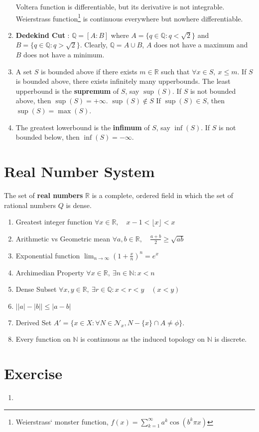 \begin{enumerate}
		\subitem Voltera function is differentiable, but its derivative is not integrable.
		\subitem Weierstrass function\footnote{Weierstrass` monster function, $f(x) = \sum_{k=1}^\infty a^k \cos (b^k\pi x)$ } is continuous everywhere but nowhere differentiable.
	\item \textbf{Dedekind Cut} : $\mathbb{Q} = [A:B]$ where $A = \{ q \in \mathbb{Q} : q < \sqrt{2} \}$ and $B = \{ q \in \mathbb{Q} : q > \sqrt{2} \}$. Clearly, $\mathbb{Q} = A \cup B$, $A$ does not have a maximum and $B$ does not have a minimum.
	\item A set $S$ is bounded above if there exists $m \in \mathbb{R}$ such that $\forall x \in S,\ x \le m$. If $S$ is bounded above, there exists infinitely many upperbounds. The least upperbound is the \textbf{supremum} of $S$, say $\sup(S)$. If $S$ is not bounded above, then $\sup(S) = +\infty$.
		\subitem $\sup(S) \notin S$
		\subitem If $\sup(S) \in S$, then $\sup(S) = \max(S)$.
	\item The greatest lowerbound is the \textbf{infimum} of $S$, say $\inf(S)$. If $S$ is not bounded below, then $\inf(S) = -\infty$.
\end{enumerate}

\section{Real Number System}
	The set of \textbf{real numbers} $\mathbb{R}$ is a complete,  ordered field in which the set of rational numbers $Q$ is dense.
\begin{enumerate}
	\item Greatest integer function
		$ \forall x \in \mathbb{R},\quad x-1 < \lfloor x \rfloor < x $ %
	\item Arithmetic vs Geometric mean
		$ \forall a,b \in \mathbb{R},\quad \frac{a+b}{2} \ge \sqrt{ab} $ 
	\item Exponential function
		$ \displaystyle \lim_{n \to \infty} \left(1+\frac{x}{n}\right)^n = e^x $
	\item Archimedian Property
		$ \forall x \in \mathbb{R},\ \exists n \in \mathbb{N} : x < n $ 
	\item Dense Subset
		$ \forall x,y \in \mathbb{R},\ \exists r \in \mathbb{Q} : x < r < y \quad (x<y) $
	\item $ \left| |a|-|b| \right|  \le |a-b| $
	\item Derived Set $A' = \{ x \in X : \forall N \in \mathcal{N}_x, N-\{x\} \cap A \ne \phi \}$.
	\item Every function on $\mathbb{N}$ is continuous as the induced topology on $\mathbb{N}$ is discrete.
\end{enumerate}

\section*{Exercise}
\begin{enumerate}
	\item
\end{enumerate}
